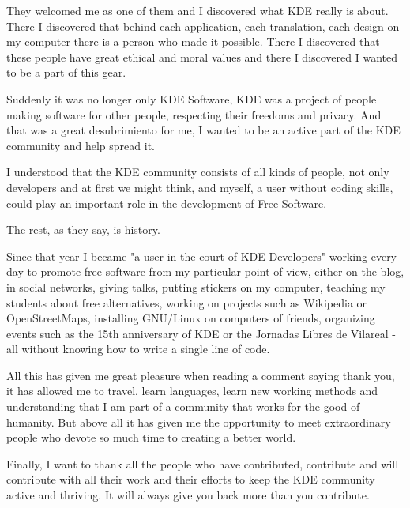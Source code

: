 They welcomed me as one of them and I discovered what KDE really is about. There I discovered that behind each application, each translation, each design on my computer there is a person who made it possible. There I discovered that these people have great ethical and moral values ​​and there I discovered I wanted to be a part of this gear.

Suddenly it was no longer only KDE Software, KDE was a project of people making software for other people, respecting their freedoms and privacy. And that was a great desubrimiento for me, I wanted to be an active part of the KDE community and help spread it.

I understood that the KDE community consists of all kinds of people, not only developers and at first we might think, and myself, a user without coding skills, could play an important role in the development of Free Software.

The rest, as they say, is history.

Since that year I became "a user in the court of KDE Developers" working every day to promote free software from my particular point of view, either on the blog, in social networks, giving talks, putting stickers on my computer, teaching my students about free alternatives, working on projects such as Wikipedia or OpenStreetMaps, installing GNU/Linux on computers of friends, organizing events such as the 15th anniversary of KDE or the Jornadas Libres de Vila­real - all without knowing how to write a single line of code.

All this has given me great pleasure when reading a comment saying thank you, it has allowed me to travel, learn languages, learn new working methods and understanding that I am part of a community that works for the good of humanity. But above all it has given me the opportunity to meet extraordinary people who devote so much time to creating a better world.

Finally, I want to thank all the people who have contributed, contribute and will contribute with all their work and their efforts to keep the KDE community active and thriving. It will always give you back more than you contribute.
